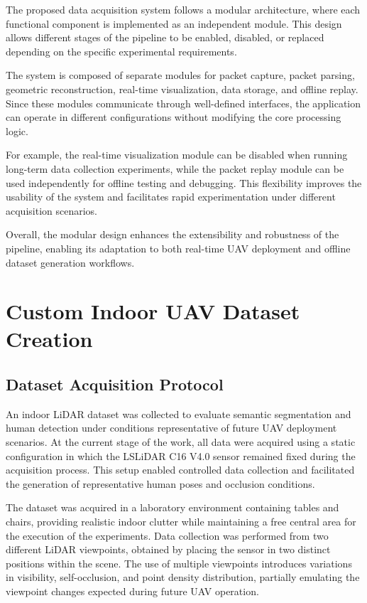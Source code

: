 The proposed data acquisition system follows a modular architecture, where each functional component is implemented as an independent module. This design allows different stages of the pipeline to be enabled, disabled, or replaced depending on the specific experimental requirements.

The system is composed of separate modules for packet capture, packet parsing, geometric reconstruction, real-time visualization, data storage, and offline replay. Since these modules communicate through well-defined interfaces, the application can operate in different configurations without modifying the core processing logic.

For example, the real-time visualization module can be disabled when running long-term data collection experiments, while the packet replay module can be used independently for offline testing and debugging. This flexibility improves the usability of the system and facilitates rapid experimentation under different acquisition scenarios.

Overall, the modular design enhances the extensibility and robustness of the pipeline, enabling its adaptation to both real-time UAV deployment and offline dataset generation workflows.

\section{Custom Indoor UAV Dataset Creation}
\label{sec:dataset_creation}

\subsection{Dataset Acquisition Protocol}
\label{subsec:acquisition_protocol}

An indoor LiDAR dataset was collected to evaluate semantic segmentation and human detection under conditions representative of future UAV deployment scenarios. At the current stage of the work, all data were acquired using a static configuration in which the LSLiDAR C16 V4.0 sensor remained fixed during the acquisition process. This setup enabled controlled data collection and facilitated the generation of representative human poses and occlusion conditions.

The dataset was acquired in a laboratory environment containing tables and chairs, providing realistic indoor clutter while maintaining a free central area for the execution of the experiments. Data collection was performed from two different LiDAR viewpoints, obtained by placing the sensor in two distinct positions within the scene. The use of multiple viewpoints introduces variations in visibility, self-occlusion, and point density distribution, partially emulating the viewpoint changes expected during future UAV operation.

